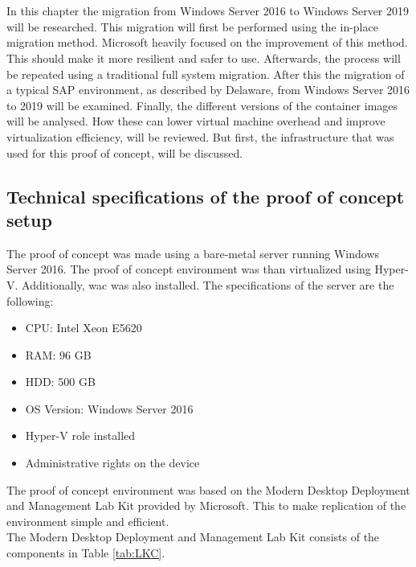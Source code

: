 \chapter{}
\label{ch:methodologie}

In this chapter the migration from Windows Server 2016 to Windows Server 2019 will be researched. This migration will first be performed using the in-place migration method. Microsoft heavily focused on the improvement of this method. This should make it more resilient and safer to use. Afterwards, the process will be repeated using a traditional full system migration. After this the migration of a typical SAP environment, as described by Delaware, from Windows Server 2016 to 2019 will be examined. Finally, the different versions of the container images will be analysed. How these can lower virtual machine overhead and improve virtualization efficiency, will be reviewed. But first, the infrastructure that was used for this proof of concept, will be discussed.

\section{Technical specifications of the proof of concept setup}
The proof of concept was made using a bare-metal server running Windows Server 2016. The proof of concept environment was than virtualized using Hyper-V. 
Additionally, \acrlong{wac} was also installed. The specifications of the server are the following:

\begin{itemize}
	\item CPU: Intel Xeon E5620
	\item RAM: 96 GB 
	\item HDD: 500 GB
	\item OS Version: Windows Server 2016
	\item Hyper-V role installed
	\item Administrative rights on the device
\end{itemize}

The proof of concept environment was based on the Modern Desktop Deployment and Management Lab Kit provided by Microsoft. \autocite{Gallagher2018}
This to make replication of the environment simple and efficient.
\\
The Modern Desktop Deployment and Management Lab Kit consists of the components in Table \ref{tab:LKC}.
\\

